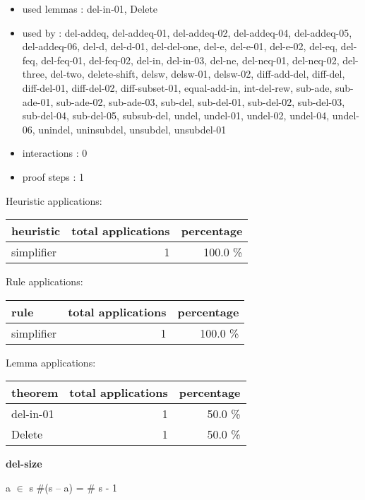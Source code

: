 \documentclass[a4paper]{article}
\begin{document}
\begin{itemize}
\item       used lemmas  : del-in-01, Delete
\item       used by      : del-addeq, del-addeq-01, del-addeq-02, del-addeq-04, del-addeq-05, del-addeq-06, del-d, del-d-01, del-del-one, del-e, del-e-01, del-e-02, del-eq, del-feq, del-feq-01, del-feq-02, del-in, del-in-03, del-ne, del-neq-01, del-neq-02, del-three, del-two, delete-shift, delsw, delsw-01, delsw-02, diff-add-del, diff-del, diff-del-01, diff-del-02, diff-subset-01, equal-add-in, int-del-rew, sub-ade, sub-ade-01, sub-ade-02, sub-ade-03, sub-del, sub-del-01, sub-del-02, sub-del-03, sub-del-04, sub-del-05, subsub-del, undel, undel-01, undel-02, undel-04, undel-06, unindel, uninsubdel, unsubdel, unsubdel-01
\item       interactions : 0
\item       proof steps  : 1
\end{itemize}

\medskip


Heuristic applications:

\begin{supertabular}{l|r|r}
heuristic	& total applications & percentage \\ \hline
simplifier & 1 & 100.0 \% \\

\end{supertabular}

Rule applications:

\begin{supertabular}{l|r|r}
rule	        & total applications & percentage \\ \hline
simplifier & 1 & 100.0 \% \\

\end{supertabular}

Lemma applications:

\begin{supertabular}{l|r|r}
theorem	        & total applications & percentage \\ \hline
del-in-01 & 1 & 50.0 \% \\
Delete & 1 & 50.0 \% \\

\end{supertabular}
\pagebreak

{\LARGE\bf del-size}\label{lemma-del-size}

\medskip

 \Fol a $\in$ s \Imp \#(s -- a) = \# s - 1
\end{document}

